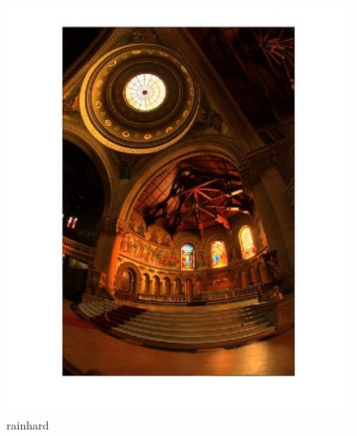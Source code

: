   \begin{figure}[!htb]
      	\includegraphics[width=\linewidth]{images/reinhardhdr1}
      	\caption{rainhard}\label{fig:logtonemap}
    \endminipage\hfill
   \end{figure}
      
